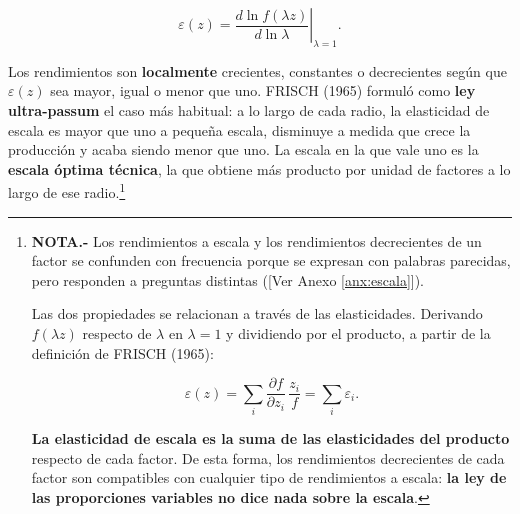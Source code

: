\documentclass[10pt,a4paper]{article}
\newcommand{\authorfont}[1]{{\fontfamily{EBGaramond-TLF}\selectfont #1}}
\begin{document}
$$\varepsilon(z)=\left.\frac{d\ln f(\lambda z)}{d\ln\lambda}\right|_{\lambda=1}.$$

Los rendimientos son \textbf{localmente} crecientes, constantes o decrecientes según que $\varepsilon(z)$ sea mayor, igual o menor que uno. FRISCH (1965) formuló como \textbf{ley ultra-passum} el caso más habitual: a lo largo de cada radio, la elasticidad de escala es mayor que uno a pequeña escala, disminuye a medida que crece la producción y acaba siendo menor que uno. La escala en la que vale uno es la \textbf{escala óptima técnica}, la que obtiene más producto por unidad de factores a lo largo de ese radio.\footnote{%
  \textbf{NOTA.-} Los rendimientos a escala y los rendimientos decrecientes de un factor se confunden con frecuencia porque se expresan con palabras parecidas, pero responden a preguntas distintas ([\authorfont{Ver Anexo \ref{anx:escala}}]).

  Las dos propiedades se relacionan a través de las elasticidades. Derivando $f(\lambda z)$ respecto de $\lambda$ en $\lambda=1$ y dividiendo por el producto, a partir de la definición de FRISCH (1965):

  $$\varepsilon(z)=\sum_i\frac{\partial f}{\partial z_i}\,\frac{z_i}{f}=\sum_i\varepsilon_i.$$

  \textbf{La elasticidad de escala es la suma de las elasticidades del producto} respecto de cada factor. De esta forma, los rendimientos decrecientes de cada factor son compatibles con cualquier tipo de rendimientos a escala: \textbf{la ley de las proporciones variables no dice nada sobre la escala}.

}
\end{document}
